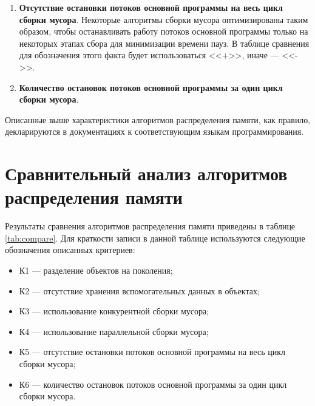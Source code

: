 \begin{enumerate}[label*=\arabic*.]
	\item \textbf{Отсутствие остановки потоков основной программы на весь цикл сборки мусора}. \newline
	Некоторые алгоритмы сборки мусора оптимизированы таким образом, чтобы останавливать работу потоков основной программы только на некоторых этапах сбора для минимизации времени пауз. В таблице сравнения для обозначения этого факта будет использоваться <<+>>, иначе --- <<->>.
	
	\item \textbf{Количество остановок потоков основной программы за один цикл сборки мусора}.
\end{enumerate}

Описанные выше характеристики алгоритмов распределения памяти, как правило, декларируются в документациях к соответствующим языкам программирования.



%
%
%
%
%
%
%
%
%
%
%



\section{Сравнительный анализ алгоритмов распределения памяти}

Результаты сравнения алгоритмов распределения памяти приведены в таблице \ref{tab:compare}. Для краткости записи в данной таблице используются следующие обозначения описанных критериев:

\begin{itemize}[label*=---]
	\item К1 --- разделение объектов на поколения;
	\item К2 --- отсутствие хранения вспомогательных данных в объектах;
	\item К3 --- использование конкурентной сборки мусора;
	\item К4 --- использование параллельной сборки мусора;
	\item К5 --- отсутствие остановки потоков основной программы на весь цикл сборки мусора;
	\item К6 --- количество остановок потоков основной программы за один цикл сборки мусора.
\end{itemize}

